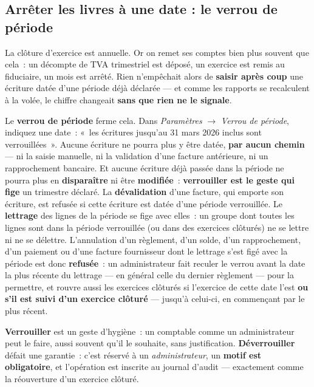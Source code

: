 \documentclass[a4paper,11pt,oneside]{article}
\begin{document}
\subsection{Arrêter les livres à une date : le verrou de période}
\label{sec:verrou-periode}

La clôture d'exercice est annuelle. Or on remet ses comptes bien plus souvent que cela~: un
décompte de TVA trimestriel est déposé, un exercice est remis au fiduciaire, un mois est arrêté.
Rien n'empêchait alors de \textbf{saisir après coup} une écriture datée d'une période déjà
déclarée --- et comme les rapports se recalculent à la volée, le chiffre changeait \textbf{sans
que rien ne le signale}.

Le \textbf{verrou de période} ferme cela. Dans \emph{Paramètres} $\rightarrow$ \emph{Verrou de
période}, indiquez une date~: «~les écritures jusqu'au 31 mars 2026 inclus sont verrouillées~». Aucune écriture ne pourra plus y être datée, \textbf{par aucun chemin} ---
ni la saisie manuelle, ni la validation d'une facture antérieure, ni un rapprochement bancaire.
Et aucune écriture déjà passée dans la période ne pourra plus en \textbf{disparaître} ni
être \textbf{modifiée}~: \textbf{verrouiller est le geste qui fige} un trimestre déclaré. La
\textbf{dévalidation} d'une facture, qui emporte son écriture, est refusée si cette écriture est
datée d'une période verrouillée.
Le \textbf{lettrage} des lignes de la période se fige avec elles~: un groupe dont toutes les
lignes sont dans la période verrouillée (ou dans des exercices clôturés) ne se lettre ni ne se
délettre. L'annulation d'un règlement, d'un solde, d'un rapprochement, d'un paiement ou d'une
facture fournisseur dont le lettrage s'est figé avec la période est donc \textbf{refusée}~: un
administrateur fait reculer le verrou avant la date la plus récente du lettrage --- en général
celle du dernier règlement --- pour la permettre, et rouvre aussi les exercices clôturés si
l'exercice de cette date l'est \textbf{ou s'il est suivi d'un exercice clôturé} --- jusqu'à
celui-ci, en commençant par le plus récent.

\begin{keshtip}[title={\faLightbulb\ Deux gestes, deux exigences différentes}]
\textbf{Verrouiller} est un geste d'hygiène~: un comptable comme un administrateur peut le
faire, aussi souvent qu'il le souhaite, sans justification. \textbf{Déverrouiller} défait une
garantie~: c'est réservé à un \emph{administrateur}, un \textbf{motif est obligatoire}, et
l'opération est inscrite au journal d'audit --- exactement comme la réouverture d'un exercice
clôturé.
\end{keshtip}
\end{document}

